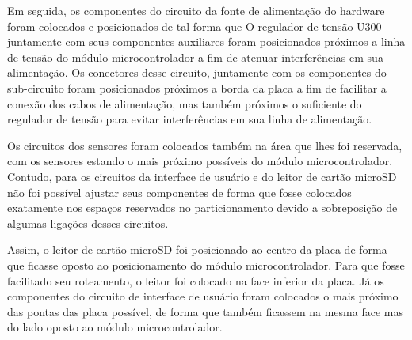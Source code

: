 Em seguida, os componentes do circuito da fonte de alimentação do hardware foram colocados e posicionados de tal forma que O regulador de tensão U300 juntamente com seus componentes auxiliares foram posicionados próximos a linha de tensão do módulo microcontrolador a fim de atenuar interferências em sua alimentação. Os conectores desse circuito, juntamente com os componentes do sub-circuito foram posicionados próximos a borda da placa a fim de facilitar a conexão dos cabos de alimentação, mas também próximos o suficiente do regulador de tensão para evitar interferências em sua linha de alimentação. 

Os circuitos dos sensores foram colocados também na área que lhes foi reservada, com os sensores estando o mais próximo possíveis do módulo microcontrolador. Contudo, para os circuitos da interface de usuário e do leitor de cartão microSD não foi possível ajustar seus componentes de forma que fosse colocados exatamente nos espaços reservados no particionamento devido a sobreposição de algumas ligações desses circuitos.

Assim, o leitor de cartão microSD foi posicionado ao centro da placa de forma que ficasse oposto ao posicionamento do módulo microcontrolador. Para que fosse facilitado seu roteamento, o leitor foi colocado na face inferior da placa. Já os componentes do circuito de interface de usuário foram colocados o mais próximo das pontas das placa possível, de forma que também ficassem na mesma face mas do lado oposto ao módulo microcontrolador.

    \begin{figure}[h!]
            \captionsetup{width=10cm}
   \end{figure}

